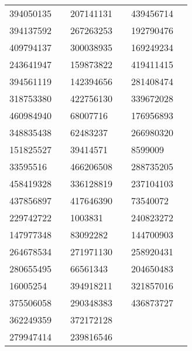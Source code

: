 \begin{longtable}{llllll}
394050135 & \cite{TIC_394050135} & 207141131 & \cite{TIC_207141131} & 439456714 & \cite{TIC_439456714} \\
394137592 & \cite{TIC_394137592} & 267263253 & \cite{TIC_267263253} & 192790476 & \cite{TIC_428699140} \\
409794137 & \cite{TIC_409794137} & 300038935 & \cite{TIC_300038935} & 169249234 & \cite{TIC_332558858} \\
243641947 & \cite{TIC_243641947} & 159873822 & \cite{TIC_159873822} & 419411415 & \cite{TIC_419411415} \\
394561119 & \cite{TIC_394561119} & 142394656 & \cite{TIC_142394656} & 281408474 & \cite{TIC_409794137} \\
318753380 & \cite{TIC_428699140} & 422756130 & \cite{TIC_422756130} & 339672028 & \cite{TIC_66561343} \\
460984940 & \cite{TIC_460984940} & 68007716 & \cite{TIC_156648452} & 176956893 & \cite{TIC_176956893} \\
348835438 & \cite{TIC_348835438} & 62483237 & \cite{TIC_428699140} & 266980320 & \cite{TIC_70513361} \\
151825527 & \cite{TIC_428699140} & 39414571 & \cite{TIC_156648452} & 8599009 & \cite{TIC_156648452} \\
33595516 & \cite{TIC_33595516} & 466206508 & \cite{TIC_466206508} & 288735205 & \cite{TIC_288735205} \\
458419328 & \cite{TIC_458419328} & 336128819 & \cite{TIC_336128819} & 237104103 & \cite{TIC_219854185} \\
437856897 & \cite{TIC_437856897} & 417646390 & \cite{TIC_70524163} & 73540072 & \cite{TIC_73540072} \\
229742722 & \cite{TIC_229742722} & 1003831 & \cite{TIC_261867566} & 240823272 & \cite{TIC_70524163} \\
147977348 & \cite{TIC_409794137} & 83092282 & \cite{TIC_162802770} & 144700903 & \cite{TIC_144700903} \\
264678534 & \cite{TIC_264678534} & 271971130 & \cite{TIC_271971130} & 258920431 & \cite{TIC_70524163} \\
280655495 & \cite{TIC_156648452} & 66561343 & \cite{TIC_66561343} & 204650483 & \cite{TIC_394918211} \\
16005254 & \cite{TIC_16005254} & 394918211 & \cite{TIC_394918211} & 321857016 & \cite{TIC_321857016} \\
375506058 & \cite{TIC_375506058} & 290348383 & \cite{TIC_290348383} & 436873727 & \cite{TIC_436873727} \\
362249359 & \cite{TIC_10837041} & 372172128 & \cite{TIC_372172128} \\
279947414 & \cite{TIC_156648452} & 239816546 & \cite{TIC_70524163} \\
\hline
\end{longtable}